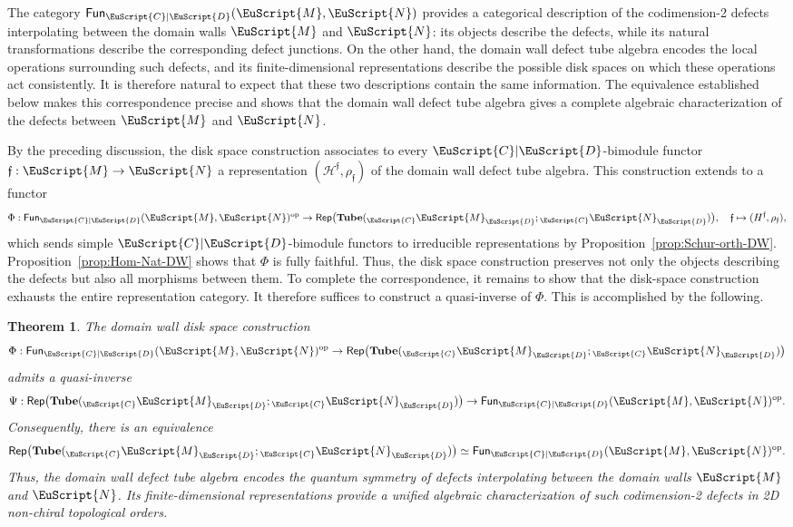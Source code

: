 \documentclass[a4paper,11pt]{article}
\newtheorem{theorem}{Theorem}[section]
\theoremstyle{definition}
\theoremstyle{remark}
\newcommand\eC           {\EuScript{C}}
\newcommand\eD           {\EuScript{D}}
\newcommand\eM          {\EuScript{M}}
\newcommand\eN         {\EuScript{N}}
\newcommand{\Rep}{\mathsf{Rep}}
\newcommand{\Tube}{\mathbf{Tube}}
\newcommand{\Fun}{\mathsf{Fun}}
\begin{document}
The category $\Fun_{\eC|\eD}(\eM,\eN)$ provides a categorical description of the codimension-2 defects interpolating between the domain walls $\eM$ and $\eN$: its objects describe the defects, while its natural transformations describe the corresponding defect
junctions. On the other hand, the domain wall defect tube algebra encodes the local operations surrounding such defects, and its finite-dimensional representations describe the possible disk spaces on which these operations act consistently. It is therefore natural to expect that these two descriptions contain the same information. The equivalence established below makes this correspondence precise and shows that the domain wall defect tube algebra gives a complete algebraic characterization of the defects between $\eM$ and $\eN$.

By the preceding discussion, the disk space construction associates to every $\eC|\eD$-bimodule functor $\mathfrak f:\eM\to\eN$ a representation $(\mathcal{H}^{\mathfrak f},\rho_{\mathfrak f})$ of the
domain wall defect tube algebra. This construction extends to a functor
\begin{equation} 
    \Phi: \Fun_{\eC|\eD}(\eM,\eN)^{\rm op} \to \Rep\bigl(\Tube({}_\eC\eM_\eD;{}_\eC\eN_\eD)\bigr), \quad \mathfrak f \mapsto (H^{\mathfrak f},\rho_{\mathfrak f}),
\end{equation}
which sends simple $\eC|\eD$-bimodule functors to irreducible representations by Proposition~\ref{prop:Schur-orth-DW}. Proposition~\ref{prop:Hom-Nat-DW} shows that $\Phi$ is fully faithful. Thus, the disk space construction preserves not only the objects describing the defects but also all morphisms between them.  To complete the correspondence, it remains to show that the disk-space construction exhausts the entire representation category.  It therefore suffices to construct a quasi-inverse of $\Phi$.  This is accomplished by the following. 


\begin{theorem}
    \label{thm:Fun-Rep-equiv-DW}
    The domain wall disk space construction
    \begin{equation} \label{eq:Phi-DW}
        \Phi: \Fun_{\eC|\eD}(\eM,\eN)^{\rm op} \to  \Rep\bigl(\Tube({}_\eC\eM_\eD;{}_\eC\eN_\eD)\bigr)
    \end{equation}
    admits a quasi-inverse
    \begin{equation}
        \Psi: \Rep\bigl(\Tube({}_\eC\eM_\eD;{}_\eC\eN_\eD)\bigr) \to \Fun_{\eC|\eD}(\eM,\eN)^{\rm op}.
    \end{equation}
    Consequently, there is an equivalence
    \begin{equation}
        \Rep\bigl(\Tube({}_\eC\eM_\eD;{}_\eC\eN_\eD)\bigr) \simeq\Fun_{\eC|\eD}(\eM,\eN)^{\rm op}.
    \end{equation}
    Thus, the domain wall defect tube algebra encodes the quantum
    symmetry of defects interpolating between the domain walls
    $\eM$ and $\eN$. Its finite-dimensional representations provide
    a unified algebraic characterization of such codimension-2
    defects in 2D non-chiral topological orders.
\end{theorem}
\end{document}
